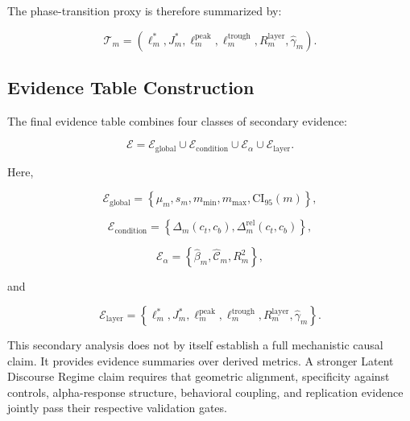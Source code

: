 The phase-transition proxy is therefore summarized by:

\begin{equation}
\mathcal{T}_m
=
\left(
\ell_m^{*},
J_m^{*},
\ell^{\mathrm{peak}}_m,
\ell^{\mathrm{trough}}_m,
R_m^{\mathrm{layer}},
\hat{\gamma}_m
\right).
\end{equation}

\subsection{Evidence Table Construction}
\label{subsec:evidence_table}

The final evidence table combines four classes of secondary evidence:

\begin{equation}
\mathcal{E}
=
\mathcal{E}_{\mathrm{global}}
\cup
\mathcal{E}_{\mathrm{condition}}
\cup
\mathcal{E}_{\alpha}
\cup
\mathcal{E}_{\mathrm{layer}}.
\end{equation}

Here,

\begin{equation}
\mathcal{E}_{\mathrm{global}}
=
\left\{
\mu_m,
s_m,
m_{\min},
m_{\max},
\mathrm{CI}_{95}(m)
\right\},
\end{equation}

\begin{equation}
\mathcal{E}_{\mathrm{condition}}
=
\left\{
\Delta_m(c_t,c_b),
\Delta^{\mathrm{rel}}_m(c_t,c_b)
\right\},
\end{equation}

\begin{equation}
\mathcal{E}_{\alpha}
=
\left\{
\hat{\beta}_m,
\hat{\mathcal{C}}_m,
R_m^2
\right\},
\end{equation}

and

\begin{equation}
\mathcal{E}_{\mathrm{layer}}
=
\left\{
\ell_m^{*},
J_m^{*},
\ell^{\mathrm{peak}}_m,
\ell^{\mathrm{trough}}_m,
R_m^{\mathrm{layer}},
\hat{\gamma}_m
\right\}.
\end{equation}

This secondary analysis does not by itself establish a full mechanistic causal claim. 
It provides evidence summaries over derived metrics. 
A stronger Latent Discourse Regime claim requires that geometric alignment, specificity against controls, alpha-response structure, behavioral coupling, and replication evidence jointly pass their respective validation gates.